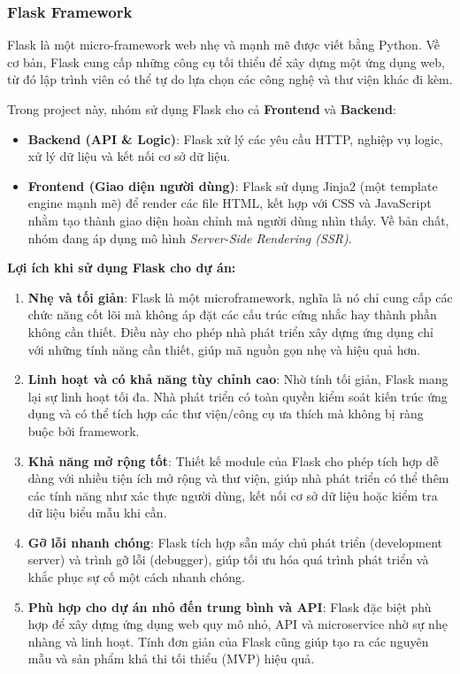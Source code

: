 \documentclass[a4paper, 15pt]{article}
\begin{document}
\subsubsection{Flask Framework}

Flask là một micro-framework web nhẹ và mạnh mẽ được viết bằng Python. Về cơ bản, Flask cung cấp những công cụ tối thiểu để xây dựng một ứng dụng web, từ đó lập trình viên có thể tự do lựa chọn các công nghệ và thư viện khác đi kèm. 

Trong project này, nhóm sử dụng Flask cho cả \textbf{Frontend} và \textbf{Backend}:

\begin{itemize}
    \item \textbf{Backend (API \& Logic)}: Flask xử lý các yêu cầu HTTP, nghiệp vụ logic, xử lý dữ liệu và kết nối cơ sở dữ liệu.
    \item \textbf{Frontend (Giao diện người dùng)}: Flask sử dụng Jinja2 (một template engine mạnh mẽ) để render các file HTML, kết hợp với CSS và JavaScript nhằm tạo thành giao diện hoàn chỉnh mà người dùng nhìn thấy. Về bản chất, nhóm đang áp dụng mô hình \textit{Server-Side Rendering (SSR)}.
\end{itemize}
\textbf{Lợi ích khi sử dụng Flask cho dự án:}

\begin{enumerate}
    \item \textbf{Nhẹ và tối giản}:  
    Flask là một microframework, nghĩa là nó chỉ cung cấp các chức năng cốt lõi mà không áp đặt các cấu trúc cứng nhắc hay thành phần không cần thiết. Điều này cho phép nhà phát triển xây dựng ứng dụng chỉ với những tính năng cần thiết, giúp mã nguồn gọn nhẹ và hiệu quả hơn.
    
    \item \textbf{Linh hoạt và có khả năng tùy chỉnh cao}:  
    Nhờ tính tối giản, Flask mang lại sự linh hoạt tối đa. Nhà phát triển có toàn quyền kiểm soát kiến trúc ứng dụng và có thể tích hợp các thư viện/công cụ ưa thích mà không bị ràng buộc bởi framework.
    
    \item \textbf{Khả năng mở rộng tốt}:  
    Thiết kế module của Flask cho phép tích hợp dễ dàng với nhiều tiện ích mở rộng và thư viện, giúp nhà phát triển có thể thêm các tính năng như xác thực người dùng, kết nối cơ sở dữ liệu hoặc kiểm tra dữ liệu biểu mẫu khi cần.
    
    \item \textbf{Gỡ lỗi nhanh chóng}:  
    Flask tích hợp sẵn máy chủ phát triển (development server) và trình gỡ lỗi (debugger), giúp tối ưu hóa quá trình phát triển và khắc phục sự cố một cách nhanh chóng.
    
    \item \textbf{Phù hợp cho dự án nhỏ đến trung bình và API}:  
    Flask đặc biệt phù hợp để xây dựng ứng dụng web quy mô nhỏ, API và microservice nhờ sự nhẹ nhàng và linh hoạt. Tính đơn giản của Flask cũng giúp tạo ra các nguyên mẫu và sản phẩm khả thi tối thiểu (MVP) hiệu quả.
\end{enumerate}
\end{document}
